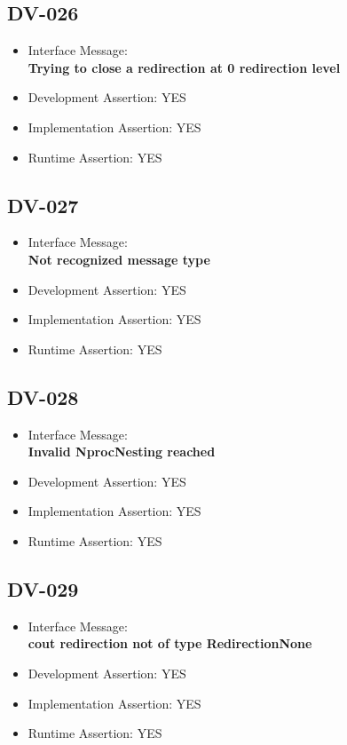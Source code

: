 \subsection{DV-026}
\begin{itemize}
  \item Interface Message:\\[1em]
    \textbf{Trying to close a redirection at 0 redirection level}
  \item Development Assertion: YES
  \item Implementation Assertion: YES
  \item Runtime Assertion: YES
\end{itemize}

\subsection{DV-027}
\begin{itemize}
  \item Interface Message:\\[1em]
    \textbf{Not recognized message type}
  \item Development Assertion: YES
  \item Implementation Assertion: YES
  \item Runtime Assertion: YES
\end{itemize}

\subsection{DV-028}
\begin{itemize}
  \item Interface Message:\\[1em]
    \textbf{Invalid NprocNesting reached}
  \item Development Assertion: YES
  \item Implementation Assertion: YES
  \item Runtime Assertion: YES
\end{itemize}

\subsection{DV-029}
\begin{itemize}
  \item Interface Message:\\[1em]
    \textbf{cout redirection not of type RedirectionNone}
  \item Development Assertion: YES
  \item Implementation Assertion: YES
  \item Runtime Assertion: YES
\end{itemize}

